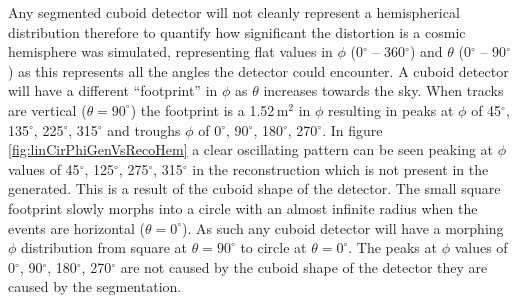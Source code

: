 Any segmented cuboid detector will not cleanly represent a hemispherical distribution therefore to quantify how significant the distortion is a cosmic hemisphere was simulated, representing flat values in $\phi$ (0$^\circ$ -- 360$^\circ$) and $\theta$ (0$^\circ$ -- 90$^\circ$) as this represents all the angles the detector could encounter. A cuboid detector will have a different ``footprint'' in $\phi$ as $\theta$ increases towards the sky. When tracks are vertical ($\theta = 90^\circ$) the footprint is a 1.52\,m$^2$ in $\phi$ resulting in peaks at $\phi$ of 45$^\circ$, 135$^\circ$, 225$^\circ$, 315$^\circ$ and troughs $\phi$ of 0$^\circ$, 90$^\circ$, 180$^\circ$, 270$^\circ$. In figure \ref{fig:linCirPhiGenVsRecoHem} a clear oscillating pattern can be seen peaking at $\phi$ values of 45$^\circ$, 125$^\circ$, 275$^\circ$, 315$^\circ$ in the reconstruction which is not present in the generated. This is a result of the cuboid shape of the detector. The small square footprint slowly morphs into a circle with an almost infinite radius when the events are horizontal ($\theta = 0^\circ$). As such any cuboid detector will have a morphing $\phi$ distribution from square at $\theta = 90^\circ$ to circle at $\theta = 0^\circ$. The peaks at $\phi$ values of 0$^\circ$, 90$^\circ$, 180$^\circ$, 270$^\circ$ are not caused by the cuboid shape of the detector they are caused by the segmentation. 
